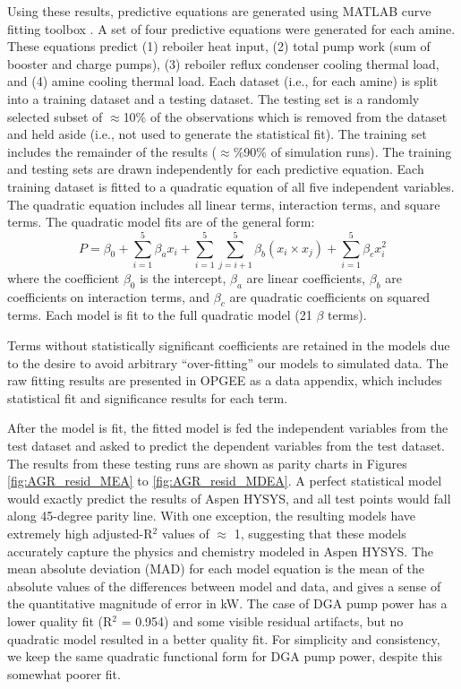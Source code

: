 \documentclass[11pt]{report}
\begin{document}
Using these results, predictive equations are generated using MATLAB curve fitting toolbox \cite{Mathworks2016}.  A set of four predictive equations were generated for each amine. These equations predict (1) reboiler heat input, (2) total pump work (sum of booster and charge pumps), (3) reboiler reflux condenser cooling thermal load, and (4) amine cooling thermal load. Each dataset (i.e., for each amine) is split into a training dataset and a testing dataset. The testing set is a randomly selected subset of $\approx$10\% of the observations which is removed from the dataset and held aside (i.e., not used to generate the statistical fit). The training set includes the remainder of the results ($\approx$\%90\% of simulation runs). The training and testing sets are drawn independently for each predictive equation. Each training dataset is fitted to a quadratic equation of all five independent variables. The quadratic equation includes all linear terms, interaction terms, and square terms. The quadratic model fits are of the general form:
\begin{equation} \label{eq:proxymodel}
P 	= \beta_0 + \sum_{i=1}^{5} \beta_a x_i + \sum_{i=1}^{5} \sum_{j=i+1}^{5} \beta_b \left(x_i \times x_j\right) + \sum_{i=1}^{5} \beta_c x_i^2
\end{equation}
where the coefficient $\beta_0$ is the intercept, $\beta_a$ are linear coefficients, $\beta_b$ are coefficients on interaction terms, and $\beta_c$ are quadratic coefficients on squared terms.  Each model is fit to the full quadratic model (21 $\beta$ terms). 

Terms without statistically significant coefficients are retained in the models due to the desire to avoid arbitrary ``over-fitting'' our models to simulated data. The raw fitting results are presented in OPGEE as a data appendix, which includes statistical fit and significance results for each term.

After the model is fit, the fitted model is fed the independent variables from the test dataset and asked to predict the dependent variables from the test dataset. The results from these testing runs are shown as parity charts in Figures \ref{fig:AGR_resid_MEA} to \ref{fig:AGR_resid_MDEA}. A perfect statistical model would exactly predict the results of Aspen HYSYS, and all test points would fall along 45-degree parity line. With one exception, the resulting models have extremely high adjusted-R$^2$ values of $\approx$ 1, suggesting that these models accurately capture the physics and chemistry modeled in Aspen HYSYS. The mean absolute deviation (MAD) for each model equation is the mean of the absolute values of the differences between model and data, and gives a sense of the quantitative magnitude of error in kW. The case of DGA pump power has a lower quality fit (R$^2$ = 0.954) and some visible residual artifacts, but no quadratic model resulted in a better quality fit. For simplicity and consistency, we keep the same quadratic functional form for DGA pump power, despite this somewhat poorer fit.
\end{document}
